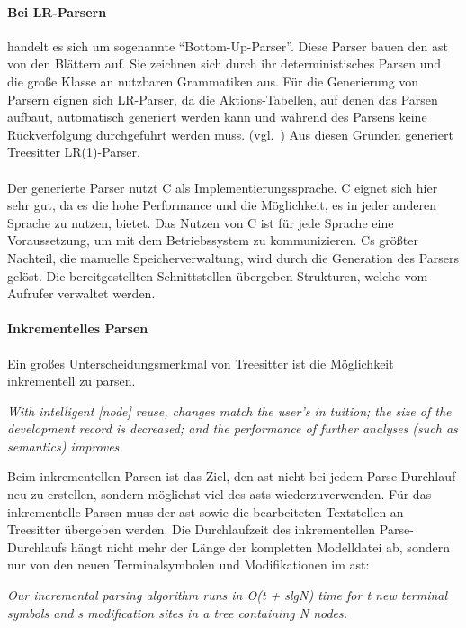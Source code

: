 \documentclass[./einleitung.tex]{subfiles}
\begin{document}
\paragraph[LR-Parsern]{Bei LR-Parsern}\label{par:lr-parser} handelt es sich um sogenannte ``Bottom-Up-Parser''.
Diese Parser bauen den \acrshort{ast} von den Blättern auf.
Sie zeichnen sich durch ihr deterministisches Parsen und die große Klasse an nutzbaren Grammatiken aus.\newline
Für die Generierung von Parsern eignen sich LR-Parser, da die Aktions-Tabellen, auf denen das Parsen aufbaut, automatisch generiert werden kann und während des Parsens keine Rückverfolgung durchgeführt werden muss. (vgl.~\cite{aho1974lr})
Aus diesen Gründen generiert Treesitter LR(1)-Parser.
\\\\
Der generierte Parser nutzt C als Implementierungssprache.
C eignet sich hier sehr gut, da es die hohe Performance und die Möglichkeit, es in jeder anderen Sprache zu nutzen, bietet.
Das Nutzen von C ist für jede Sprache eine Voraussetzung, um mit dem Betriebssystem zu kommunizieren.
Cs größter Nachteil, die manuelle Speicherverwaltung, wird durch die Generation des Parsers gelöst.
Die bereitgestellten Schnittstellen übergeben Strukturen, welche vom Aufrufer verwaltet werden.
\paragraph{Inkrementelles Parsen}
Ein großes Unterscheidungsmerkmal von Treesitter ist die Möglichkeit inkrementell zu parsen.
\newline
 \begin{center}
 \textit{With intelligent [node] reuse, changes match the user’s in
tuition; the size of the development record is decreased; and the performance
 of further analyses (such as semantics) improves.~\cite{twagner}}
 \end{center}
Beim inkrementellen Parsen ist das Ziel, den \acrshort{ast} nicht bei jedem Parse-Durchlauf neu zu erstellen, sondern möglichst viel des \acrshort{ast}s wiederzuverwenden.
Für das inkrementelle Parsen muss der \acrshort{ast} sowie die bearbeiteten Textstellen an Treesitter übergeben werden.
Die Durchlaufzeit des inkrementellen Parse-Durchlaufs hängt nicht mehr der Länge der kompletten Modelldatei ab, sondern nur von den neuen Terminalsymbolen und Modifikationen im \acrshort{ast}:
 \newline
 \begin{center}
 \textit{Our incremental parsing algorithm runs in O(t + slgN) time for t new terminal symbols and s modification sites in a tree containing N nodes.~\cite{twagner}}
 \end{center}
\end{document}
